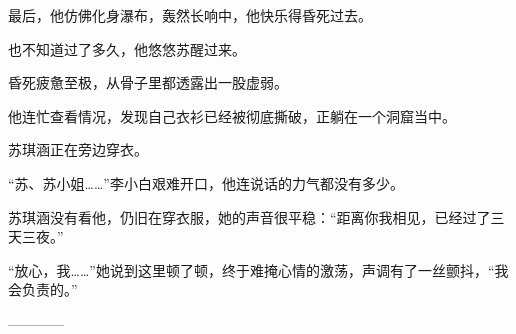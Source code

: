 \begin{this_body}
最后，他仿佛化身瀑布，轰然长响中，他快乐得昏死过去。

也不知道过了多久，他悠悠苏醒过来。

昏死疲惫至极，从骨子里都透露出一股虚弱。

他连忙查看情况，发现自己衣衫已经被彻底撕破，正躺在一个洞窟当中。

苏琪涵正在旁边穿衣。

“苏、苏小姐……”李小白艰难开口，他连说话的力气都没有多少。

苏琪涵没有看他，仍旧在穿衣服，她的声音很平稳：“距离你我相见，已经过了三天三夜。”

“放心，我……”她说到这里顿了顿，终于难掩心情的激荡，声调有了一丝颤抖，“我会负责的。”

------------

\end{this_body}

